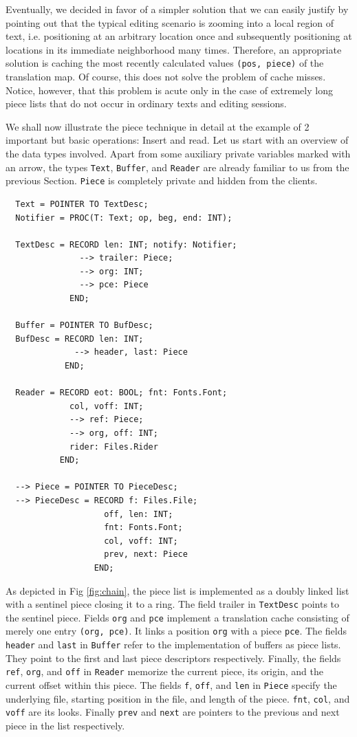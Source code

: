 Eventually, we decided in favor of a simpler solution that we can easily justify
by pointing out that the typical editing scenario is zooming into a local region of text,
i.e. positioning at an arbitrary location once and subsequently positioning at locations
in its immediate neighborhood many times.  Therefore, an appropriate solution is
caching the most recently calculated values \verb|(pos, piece)| of the translation map.
Of course, this does not solve the problem of cache misses.  Notice, however, that
this problem is acute only in the case of extremely long piece lists that do not occur
in ordinary texts and editing sessions.

We shall now illustrate the piece technique in detail
at the example of 2 important but basic operations: Insert and read.
Let us start with an overview of the data types involved.
Apart from some auxiliary private variables marked with an arrow,
the types \verb|Text|, \verb|Buffer|, and \verb|Reader| are already familiar to us
from the previous Section.  \verb|Piece| is completely private and hidden from the clients.
\begin{verbatim}
  Text = POINTER TO TextDesc;
  Notifier = PROC(T: Text; op, beg, end: INT);
 
  TextDesc = RECORD len: INT; notify: Notifier;
               --> trailer: Piece;
               --> org: INT;
               --> pce: Piece
             END;
 
  Buffer = POINTER TO BufDesc;
  BufDesc = RECORD len: INT;
              --> header, last: Piece
            END;
  
  Reader = RECORD eot: BOOL; fnt: Fonts.Font;
             col, voff: INT;
             --> ref: Piece;
             --> org, off: INT;
             rider: Files.Rider
           END;
  
  --> Piece = POINTER TO PieceDesc;
  --> PieceDesc = RECORD f: Files.File;
                    off, len: INT;
                    fnt: Fonts.Font;
                    col, voff: INT;
                    prev, next: Piece
                  END;
\end{verbatim}

As depicted in Fig \ref{fig:chain}, the piece list is implemented as a doubly linked list
with a sentinel piece closing it to a ring.
The field trailer in \verb|TextDesc| points to the sentinel piece.
Fields \verb|org| and \verb|pce| implement a translation cache consisting of merely one entry
\verb|(org, pce)|.  It links a position \verb|org| with a piece \verb|pce|.
The fields \verb|header| and \verb|last| in \verb|Buffer| refer to the implementation
of buffers as piece lists.  They point to the first and last piece descriptors respectively.
Finally, the fields \verb|ref|, \verb|org|, and \verb|off| in \verb|Reader|
memorize the current piece, its origin, and the current offset within this piece.
The fields \verb|f|, \verb|off|, and \verb|len| in \verb|Piece| specify the underlying file,
starting position in the file, and length of the piece.
\verb|fnt|, \verb|col|, and \verb|voff| are its looks.
Finally \verb|prev| and \verb|next| are pointers to the previous and next piece in the list respectively.

